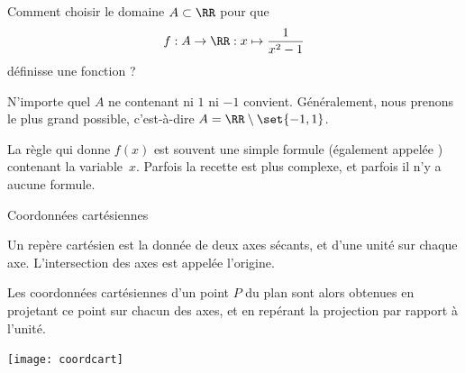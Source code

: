 \begin{frame}
  \begin{exercise}
    Comment choisir le domaine \(A \subset \RR\) pour que
    \begin{equation*}
      f : A \to \RR : x \mapsto \frac{1}{x^{2}-1}
    \end{equation*}
    définisse une fonction ?

    \begin{answer}
    N'importe quel \(A\) ne contenant ni \(1\) ni \(-1\) convient. Généralement, nous prenons \og le plus grand possible\fg{}, c'est-à-dire \(A = \RR\setminus\set{-1,1}\).
  \end{answer}





  \end{exercise}\pause
  \begin{remark*}
    La règle qui donne $f(x)$ est souvent une simple formule (également appelée ) contenant la variable~$x$. Parfois la recette est plus complexe, et parfois il n'y a aucune formule.
  \end{remark*}
\end{frame}

\begin{frame}{Coordonnées cartésiennes}
  \begin{definition}
    Un {repère cartésien} est la donnée de deux axes sécants, et d'une unité sur chaque axe. L'intersection des axes est appelée l'origine.

    Les coordonnées cartésiennes d'un point \(P\) du plan sont alors obtenues en projetant ce point sur chacun des axes, et en repérant la projection par rapport à l'unité.
  \end{definition}
  
  \begin{center}
    \texttt{[image: coordcart]}
  \end{center}
\end{frame}

